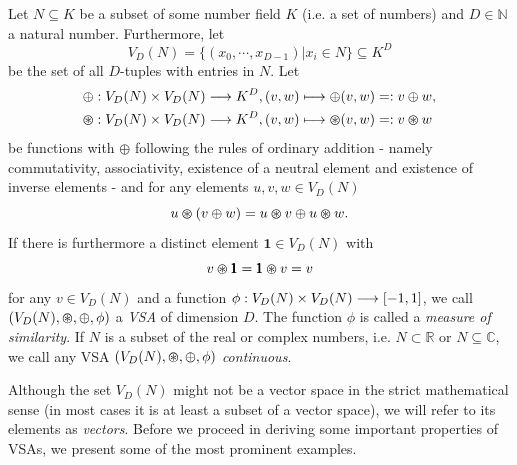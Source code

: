 \begin{defn}
	\label{def:VSA}
	Let $N \subseteq K$ be a subset of some number field $K$ (i.e. a set of numbers) and $D \in \mathbb{N}$ a natural number. 
	Furthermore, let 
	\[V_{D}(N)=\{\left(x_{0}, \cdots, x_{D-1}\right)  | x_{i} \in N\} \subseteq K^{D}\] 
	be the set of all $D$-tuples with entries in $N$. 
	Let
	\begin{align*}
		&\oplus: V_{D}(N) \times V_{D}(N) \longrightarrow K^{D}, (v,w) \longmapsto \oplus(v,w) =: v\oplus w, \\
		&\varoast: V_{D}(N) \times V_{D}(N) \longrightarrow K^{D}, (v,w) \longmapsto \varoast(v,w) =: v\varoast w
	\end{align*}
	be functions with $\oplus$ following the rules of ordinary addition - namely commutativity, associativity, existence of a neutral element and existence of inverse elements - and for any elements $u,v,w \in V_{D}(N)$
	\[u \varoast (v \oplus w) = u \varoast v \oplus u \varoast w.\]
	If there is furthermore a distinct element $\pmb{1} \in V_{D}(N)$ with 
	\[v \varoast \pmb{1} = \pmb{1} \varoast v = v\]
	for any $v \in V_{D}(N)$ and a function $\phi: V_{D}(N) \times V_{D}(N) \longrightarrow \left[-1,1\right]$, we call $(V_{D}(N), \varoast, \oplus, \phi)$ a \emph{\acrfull{VSA}} of dimension $D$.
	The function $\phi$ is called a \emph{measure of similarity}.
	If $N$ is a subset of the real or complex numbers, i.e. $N \subset \mathbb{R}$ or $N \subseteq \mathbb{C}$, we call any \ac{VSA} $\left(V_{D}(N), \varoast, \oplus, \phi\right)$ \emph{continuous}.
\end{defn}
Although the set $V_{D}(N)$ might not be a vector space in the strict mathematical sense (in most cases it is at least a subset of a vector space), we will refer to its elements as \emph{vectors}.
Before we proceed in deriving some important properties of \acp{VSA}, we present some of the most prominent examples.

